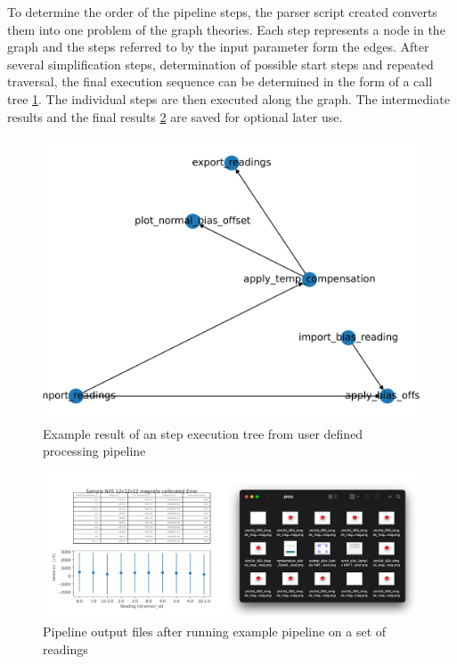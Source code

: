 To determine the order of the pipeline steps, the parser script created
converts them into one problem of the graph theories. Each step
represents a node in the graph and the steps referred to by the input
parameter form the edges. After several simplification steps,
determination of possible start steps and repeated traversal, the final
execution sequence can be determined in the form of a call tree
\ref{Example_result_of_an_step_execution_tree_from_user_defined_processing_pipeline.png}.
The individual steps are then executed along the graph. The intermediate
results and the final results
\ref{Pipeline_output_files_after_running_example_pipeline_on_a_set_of_readings.png}
are saved for optional later use.

\begin{figure}
\centering
\includegraphics{./generated_images/border_Example_result_of_an_step_execution_tree_from_user_defined_processing_pipeline.png}
\caption{Example result of an step execution tree from user defined
processing pipeline
\label{Example_result_of_an_step_execution_tree_from_user_defined_processing_pipeline.png}}
\end{figure}

\begin{figure}
\centering
\includegraphics{./generated_images/border_Pipeline_output_files_after_running_example_pipeline_on_a_set_of_readings.png}
\caption{Pipeline output files after running example pipeline on a set
of readings
\label{Pipeline_output_files_after_running_example_pipeline_on_a_set_of_readings.png}}
\end{figure}


